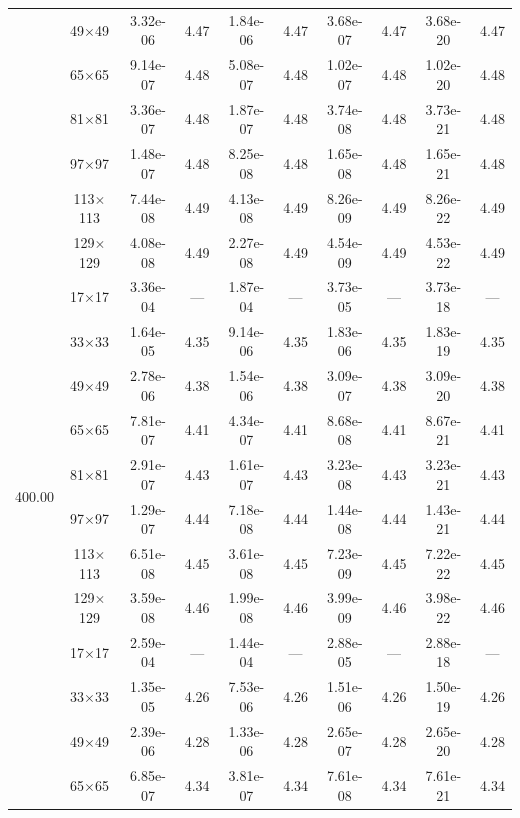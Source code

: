 \begin{table}[H]
{\begin{tabular*}{\textwidth}{@{\extracolsep\fill}c|c|cc|cc|cc|cc@{}}
                & 49$\times$49 & 3.32e-06 & 4.47 & 1.84e-06 & 4.47 & 3.68e-07 & 4.47 & 3.68e-20 & 4.47 \\
                & 65$\times$65 & 9.14e-07 & 4.48 & 5.08e-07 & 4.48 & 1.02e-07 & 4.48 & 1.02e-20 & 4.48 \\
                & 81$\times$81 & 3.36e-07 & 4.48 & 1.87e-07 & 4.48 & 3.74e-08 & 4.48 & 3.73e-21 & 4.48 \\
                & 97$\times$97 & 1.48e-07 & 4.48 & 8.25e-08 & 4.48 & 1.65e-08 & 4.48 & 1.65e-21 & 4.48 \\
                & 113$\times$113 & 7.44e-08 & 4.49 & 4.13e-08 & 4.49 & 8.26e-09 & 4.49 & 8.26e-22 & 4.49 \\
                & 129$\times$129 & 4.08e-08 & 4.49 & 2.27e-08 & 4.49 & 4.54e-09 & 4.49 & 4.53e-22 & 4.49 \\
                \midrule
                \multirow{10}{*}{400.00} & 17$\times$17 & 3.36e-04 & --- & 1.87e-04 & --- & 3.73e-05 & --- & 3.73e-18 & --- \\
                & 33$\times$33 & 1.64e-05 & 4.35 & 9.14e-06 & 4.35 & 1.83e-06 & 4.35 & 1.83e-19 & 4.35 \\
                & 49$\times$49 & 2.78e-06 & 4.38 & 1.54e-06 & 4.38 & 3.09e-07 & 4.38 & 3.09e-20 & 4.38 \\
                & 65$\times$65 & 7.81e-07 & 4.41 & 4.34e-07 & 4.41 & 8.68e-08 & 4.41 & 8.67e-21 & 4.41 \\
                & 81$\times$81 & 2.91e-07 & 4.43 & 1.61e-07 & 4.43 & 3.23e-08 & 4.43 & 3.23e-21 & 4.43 \\
                & 97$\times$97 & 1.29e-07 & 4.44 & 7.18e-08 & 4.44 & 1.44e-08 & 4.44 & 1.43e-21 & 4.44 \\
                & 113$\times$113 & 6.51e-08 & 4.45 & 3.61e-08 & 4.45 & 7.23e-09 & 4.45 & 7.22e-22 & 4.45 \\
                & 129$\times$129 & 3.59e-08 & 4.46 & 1.99e-08 & 4.46 & 3.99e-09 & 4.46 & 3.98e-22 & 4.46 \\
                \midrule
                \multirow{10}{*}{1000.00} & 17$\times$17 & 2.59e-04 & --- & 1.44e-04 & --- & 2.88e-05 & --- & 2.88e-18 & --- \\
                & 33$\times$33 & 1.35e-05 & 4.26 & 7.53e-06 & 4.26 & 1.51e-06 & 4.26 & 1.50e-19 & 4.26 \\
                & 49$\times$49 & 2.39e-06 & 4.28 & 1.33e-06 & 4.28 & 2.65e-07 & 4.28 & 2.65e-20 & 4.28 \\
                & 65$\times$65 & 6.85e-07 & 4.34 & 3.81e-07 & 4.34 & 7.61e-08 & 4.34 & 7.61e-21 & 4.34 \\

\end{tabular*}}
\end{table}
